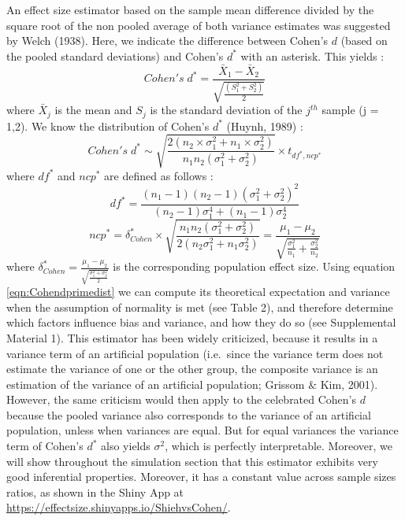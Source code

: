 \documentclass[
  english,
  man,floatsintext]{apa6}
\begin{document}
An effect size estimator based on the sample mean difference divided by the square root of the non pooled average of both variance estimates was suggested by Welch (1938). Here, we indicate the difference between Cohen's \(d\) (based on the pooled standard deviations) and Cohen's \(d^*\) with an asterisk. This yields :
\begin{equation*} 
Cohen's \; d^* = \frac{\bar{X}_{1} - \bar{X}_{2}}{ \sqrt{\frac{\left(S^2_{1}+S^2_{2} \right)}{2}}}
\label{eqn:Cohenprimeds}
\end{equation*}
where \(\bar{X}_{j}\) is the mean and \(S_j\) is the standard deviation of the \(j^{th}\) sample (j = 1,2). We know the distribution of Cohen's \(d^*\) (Huynh, 1989) :
\begin{equation} 
Cohen's \; d^* \sim  \sqrt{\frac{2(n_2\times\sigma^2_1+n_1\times\sigma^2_2)}{n_1n_2(\sigma^2_1+\sigma^2_2)}} \times t_{df^*,ncp^*}
\label{eqn:Cohendprimedist}
\end{equation}
where \(df^*\) and \(ncp^*\) are defined as follows :
\begin{equation} 
df^* = \frac{(n_1-1)(n_2-1)(\sigma^2_1+\sigma^2_2)^2}{(n_2-1)\sigma^4_1+(n_1-1)\sigma^4_2}
\label{eqn:Cohendprimedf}
\end{equation}
\begin{equation*} 
ncp^*=\delta^*_{Cohen} \times \sqrt{\frac{n_1n_2(\sigma^2_1+\sigma^2_2)}{2(n_2\sigma^2_1+n_1\sigma^2_2)}}=\frac{\mu_1-\mu_2}{\sqrt{\frac{\sigma_1^2}{n_1}+\frac{\sigma^2_2}{n_2}}}
\label{eqn:Cohendprimevst}
\end{equation*}
where \(\delta^*_{Cohen}=\frac{\mu_1-\mu_2}{\sqrt{\frac{\sigma^2_1+\sigma^2_2}{2}}}\) is the corresponding population effect size. Using equation \ref{eqn:Cohendprimedist} we can compute its theoretical expectation and variance when the assumption of normality is met (see Table 2), and therefore determine which factors influence bias and variance, and how they do so (see Supplemental Material 1). This estimator has been widely criticized, because it results in a variance term of an artificial population (i.e.~since the variance term does not estimate the variance of one or the other group, the composite variance is an estimation of the variance of an artificial population; Grissom \(\&\) Kim, 2001). However, the same criticism would then apply to the celebrated Cohen's \(d\) because the pooled variance also corresponds to the variance of an artificial population, unless when variances are equal. But for equal variances the variance term of Cohen's \(d^*\) also yields \(\sigma^2\), which is perfectly interpretable. Moreover, we will show throughout the simulation section that this estimator exhibits very good inferential properties. Moreover, it has a constant value across sample sizes ratios, as shown in the Shiny App at \url{https://effectsize.shinyapps.io/ShiehvsCohen/}.
\end{document}
